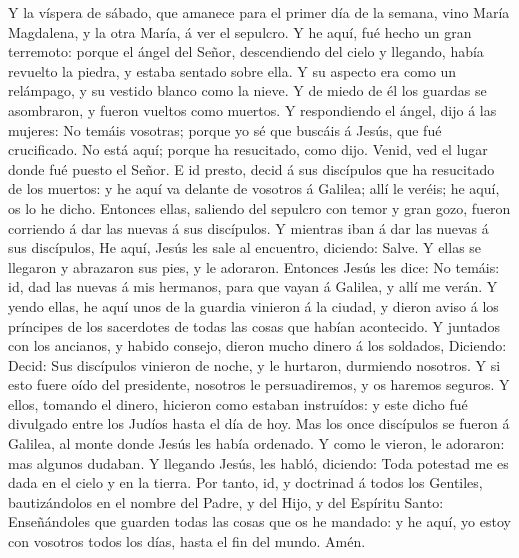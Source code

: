  Y la víspera de sábado, que amanece para el primer día de
la semana, vino María Magdalena, y la otra María, á ver el sepulcro.
 Y he aquí, fué hecho un gran terremoto: porque el ángel del
Señor, descendiendo del cielo y llegando, había revuelto la piedra, y
estaba sentado sobre ella.  Y su aspecto era como un
relámpago, y su vestido blanco como la nieve.  Y de miedo de
él los guardas se asombraron, y fueron vueltos como muertos.
 Y respondiendo el ángel, dijo á las mujeres: No temáis
vosotras; porque yo sé que buscáis á Jesús, que fué crucificado.
 No está aquí; porque ha resucitado, como dijo. Venid, ved
el lugar donde fué puesto el Señor.  E id presto, decid á
sus discípulos que ha resucitado de los muertos: y he aquí va delante de
vosotros á Galilea; allí le veréis; he aquí, os lo he dicho.
 Entonces ellas, saliendo del sepulcro con temor y gran
gozo, fueron corriendo á dar las nuevas á sus discípulos. Y mientras
iban á dar las nuevas á sus discípulos,  He aquí, Jesús les
sale al encuentro, diciendo: Salve. Y ellas se llegaron y abrazaron sus
pies, y le adoraron.  Entonces Jesús les dice: No temáis:
id, dad las nuevas á mis hermanos, para que vayan á Galilea, y allí me
verán.  Y yendo ellas, he aquí unos de la guardia vinieron
á la ciudad, y dieron aviso á los príncipes de los sacerdotes de todas
las cosas que habían acontecido.  Y juntados con los
ancianos, y habido consejo, dieron mucho dinero á los soldados,
 Diciendo: Decid: Sus discípulos vinieron de noche, y le
hurtaron, durmiendo nosotros.  Y si esto fuere oído del
presidente, nosotros le persuadiremos, y os haremos seguros.
 Y ellos, tomando el dinero, hicieron como estaban
instruídos: y este dicho fué divulgado entre los Judíos hasta el día de
hoy.  Mas los once discípulos se fueron á Galilea, al monte
donde Jesús les había ordenado.  Y como le vieron, le
adoraron: mas algunos dudaban.  Y llegando Jesús, les
habló, diciendo: Toda potestad me es dada en el cielo y en la tierra.
 Por tanto, id, y doctrinad á todos los Gentiles,
bautizándolos en el nombre del Padre, y del Hijo, y del Espíritu Santo:
 Enseñándoles que guarden todas las cosas que os he
mandado: y he aquí, yo estoy con vosotros todos los días, hasta el fin
del mundo. Amén.
